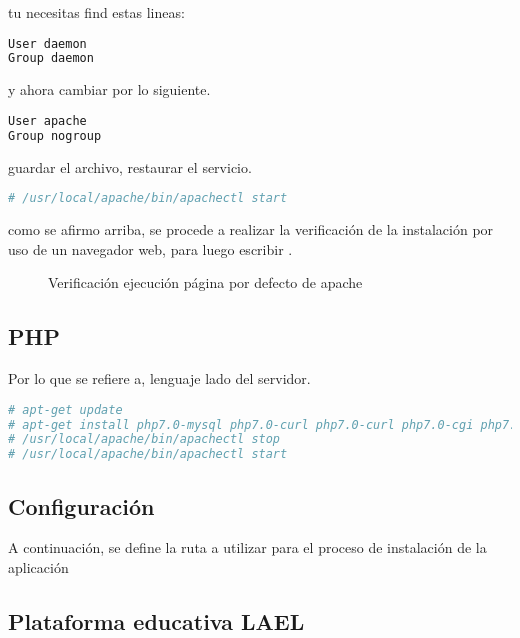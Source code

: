 tu necesitas find estas lineas:

\begin{lstlisting}[language=bash, caption={}]
User daemon
Group daemon
\end{lstlisting}

y ahora cambiar por lo siguiente.

\begin{lstlisting}[language=bash, caption={}]
User apache
Group nogroup
\end{lstlisting}

guardar el archivo, restaurar el servicio.

\begin{lstlisting}[language=bash, caption={}]
# /usr/local/apache/bin/apachectl start
\end{lstlisting}

como se afirmo arriba, se procede a realizar la verificación de la instalación
por uso de un navegador web, para luego escribir . 

\begin{figure}[!ht]
\centering
		\caption{Verificación ejecución página por defecto de apache}
\end{figure}


\subsection{PHP}

Por lo que se refiere a, lenguaje lado del servidor.

\begin{lstlisting}[language=bash, caption={Comando para instalación de lenguaje en el lado del servidor}]
# apt-get update
# apt-get install php7.0-mysql php7.0-curl php7.0-curl php7.0-cgi php7.0 libapache2-mod-php7
# /usr/local/apache/bin/apachectl stop
# /usr/local/apache/bin/apachectl start
\end{lstlisting}

\subsection{Configuración}

A continuación, se define la ruta a utilizar para el proceso de instalación de
la aplicación 

\subsection{Plataforma educativa LAEL}

